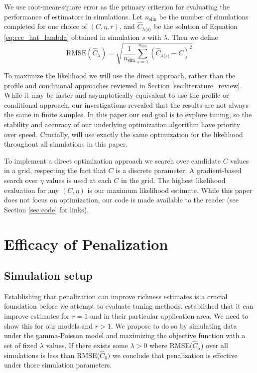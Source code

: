 \documentclass[oupdraft]{bio}
\begin{document}
We use root-mean-square error as the primary criterion for evaluating the performance of estimators in simulations.  Let $n_{\text{sim}}$ be the number of simulations completed for one choice of $(C, \eta, r)$, and $\widehat{C}_{\lambda \langle s \rangle}$ be the solution of Equation \ref{eq:ccc_hat_lambda} obtained in simulation $s$ with  $\lambda$.  Then we define 
\begin{equation}
 \text{RMSE}\left( \widehat{C}_{\lambda} \right) = \sqrt{ \frac{1}{n_{\text{sim}}} \sum_{s=1}^{n_{\text{sim}}} \left( \widehat{C}_{\lambda \langle s \rangle} - C\right)^2 } 
\end{equation}

To maximize the likelihood we will use the direct approach, rather than the profile and conditional approaches reviewed in Section \ref{sec:literature_review}.  While it may be faster and asymptotically equivalent to use the profile or conditional approach, our investigations revealed that the results are not always the same in finite samples.  In this paper our end goal is to explore tuning, so the stability and accuracy of our underlying optimization algorithm have priority over speed.  Crucially, will use exactly the same optimization for the likelihood throughout all simulations in this paper.

To implement a direct optimization approach we search over candidate $C$ values in a grid, respecting the fact that $C$ is a discrete parameter.  A gradient-based search over $\eta$ values is used at each $C$ in the grid.  The highest likelihood evaluation for any $(C, \eta)$ is our maximum likelihood estimate.  While this paper does not focus on optimization, our code is made available to the reader (see Section \ref{sec:code} for links).

\section{Efficacy of Penalization}
\label{sec:efficacy_sims}
\subsection{Simulation setup}

Establishing that penalization can improve richness estimates is a crucial foundation before we attempt to evaluate tuning methods.  \citet{wang_2005} established that it can improve estimates for $r = 1$ and in their particular application area.  We need to show this for our models and $r > 1$.  We propose to do so by simulating data under the gamma-Poisson model and maximizing the objective function with a set of fixed $\lambda$ values.  If there exists some $\lambda > 0$ where RMSE($\widehat{C}_{\lambda}$) over all simulations is less than RMSE($\widehat{C}_0)$ we conclude that penalization is effective under those simulation parameters.
\end{document}
